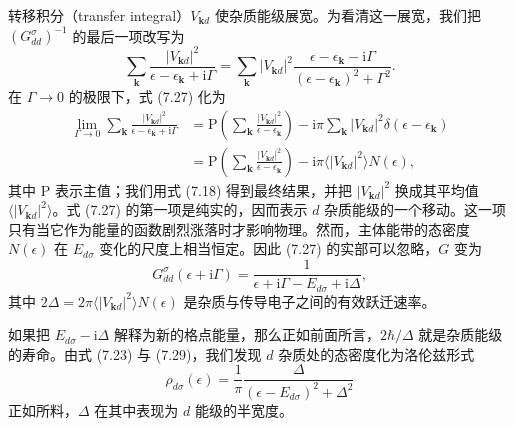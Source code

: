 转移积分（transfer integral）$V_{\mathbf{k}d}$ 使杂质能级展宽。为看清这一展宽，我们把 $(G_{dd}^{\sigma})^{-1}$ 的最后一项改写为
\begin{equation*}
\sum_{\mathbf{k}}\frac{|V_{\mathbf{k}d}|^{2}}{\epsilon-\epsilon_{\mathbf{k}}+\mathrm{i}\Gamma}=\sum_{\mathbf{k}}|V_{\mathbf{k}d}|^{2}\frac{\epsilon-\epsilon_{\mathbf{k}}-\mathrm{i}\Gamma}{(\epsilon-\epsilon_{\mathbf{k}})^{2}+\Gamma^{2}}.\tag{7.27}
\end{equation*}
在 $\Gamma\to 0$ 的极限下，式 (7.27) 化为
\begin{equation*}
\begin{aligned}
\lim_{\Gamma\to 0}\sum_{\mathbf{k}}\frac{|V_{\mathbf{k}d}|^{2}}{\epsilon-\epsilon_{\mathbf{k}}+\mathrm{i}\Gamma}&=\mathrm{P}\left(\sum_{\mathbf{k}}\frac{|V_{\mathbf{k}d}|^{2}}{\epsilon-\epsilon_{\mathbf{k}}}\right)-\mathrm{i}\pi\sum_{\mathbf{k}}|V_{\mathbf{k}d}|^{2}\delta(\epsilon-\epsilon_{\mathbf{k}})\\
&=\mathrm{P}\left(\sum_{\mathbf{k}}\frac{|V_{\mathbf{k}d}|^{2}}{\epsilon-\epsilon_{\mathbf{k}}}\right)-\mathrm{i}\pi\langle|V_{\mathbf{k}d}|^{2}\rangle N(\epsilon),
\end{aligned}\tag{7.28}
\end{equation*}
其中 $\mathrm{P}$ 表示主值；我们用式 (7.18) 得到最终结果，并把 $|V_{\mathbf{k}d}|^{2}$ 换成其平均值 $\langle|V_{\mathbf{k}d}|^{2}\rangle$。式 (7.27) 的第一项是纯实的，因而表示 $d$ 杂质能级的一个移动。这一项只有当它作为能量的函数剧烈涨落时才影响物理。然而，主体能带的态密度 $N(\epsilon)$ 在 $E_{d\sigma}$ 变化的尺度上相当恒定。因此 (7.27) 的实部可以忽略，$G$ 变为
\begin{equation*}
G_{dd}^{\sigma}(\epsilon+\mathrm{i}\Gamma)=\frac{1}{\epsilon+\mathrm{i}\Gamma-E_{d\sigma}+\mathrm{i}\Delta},\tag{7.29}
\end{equation*}
其中 $2\Delta=2\pi\langle|V_{\mathbf{k}d}|^{2}\rangle N(\epsilon)$ 是杂质与传导电子之间的有效跃迁速率。

如果把 $E_{d\sigma}-\mathrm{i}\Delta$ 解释为新的格点能量，那么正如前面所言，$2\hbar/\Delta$ 就是杂质能级的寿命。由式 (7.23) 与 (7.29)，我们发现 $d$ 杂质处的态密度化为洛伦兹形式
\begin{equation*}
\rho_{d\sigma}(\epsilon)=\frac{1}{\pi}\frac{\Delta}{(\epsilon-E_{d\sigma})^{2}+\Delta^{2}}\tag{7.30}
\end{equation*}
正如所料，$\Delta$ 在其中表现为 $d$ 能级的半宽度。

